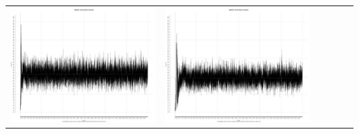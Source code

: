 \begin{table}[htbp]
{\begin{tabular}{l | ccccc}
\begin{minipage}{.15\textwidth}
     			 	\includegraphics[width=\linewidth]{images/mema-triple/N12}
    				 \end{minipage}
    			   &	 \begin{minipage}{.15\textwidth}\vspace{2pt}     							
     			 	\includegraphics[width=\linewidth]{images/mema-triple/N14}
    				 \end{minipage}
    			   &	 \begin{minipage}{.15\textwidth}\vspace{2pt}     							

\end{minipage}
\end{tabular}}
\end{table}
